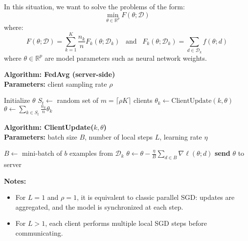 In this situation, we want to solve the problems of the form:
\begin{equation}
    \min_{\theta \in \mathbb{R}^p} F(\theta; \mathcal{D})
\end{equation}
where:
\begin{equation}
    F(\theta; \mathcal{D}) = \sum_{k = 1}^K \frac{n_k}{n} F_k(\theta; \mathcal{D}_k) \,\,\, \text{ and }
    \,\,\, F_k(\theta; \mathcal{D}_k) = \sum_{d \in \mathcal{D}_k} f(\theta; d)
\end{equation}
where $\theta \in \mathbb{R}^p$ are model parameters such as neural network weights.

\begin{multicols}{2}
    \noindent
    \textbf{Algorithm: FedAvg (server-side)} \\
    \textbf{Parameters:} client sampling rate $\rho$ \\
    \begin{algorithmic}[1]
        \State Initialize $\theta$
        \State $S_t \gets$ random set of $m = \lceil \rho K \rceil$ clients
        \State $\theta_k \gets \text{ClientUpdate}(k, \theta)$
        \EndFor
        \State $\theta \gets \sum_{k \in S_t} \frac{n_k}{n} \theta_k$
        \EndFor
    \end{algorithmic}

    \vfill

    \columnbreak

    \noindent
    \textbf{Algorithm: ClientUpdate($k, \theta$)} \\
    \textbf{Parameters:} batch size $B$, number of local steps $L$, learning rate $\eta$ \\
    \begin{algorithmic}[1]
        \State $B \gets$ mini-batch of $b$ examples from $\mathcal{D}_k$
        \State $\theta \gets \theta - \frac{\eta}{B} \sum_{d \in B} \nabla \ell(\theta; d)$
        \EndFor
        \State \textbf{send} $\theta$ to server
    \end{algorithmic}
\end{multicols}

\textbf{Notes:}
\begin{itemize}
    \item For $L = 1$ and $\rho = 1$, it is equivalent to classic parallel SGD:
          updates are aggregated, and the model is synchronized at each step.
    \item For $L > 1$, each client performs multiple local SGD steps before communicating.
\end{itemize}

